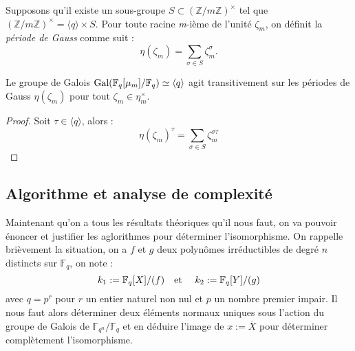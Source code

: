 \documentclass[a4paper]{article} %
\numberwithin{section}{part}
\numberwithin{equation}{section}
\newcommand\nroot[1]{\textit{#1}-ième}
\newcommand\zmodninv[1]{(\mathbb{Z}/#1\mathbb{Z})^{\times}}
\newcommand\GF[1]{\mathbb{F}_{#1}}
\newcommand\etmath{\textup{\quad et \quad}}
\begin{document}
\begin{defn}
Supposons qu'il existe un sous-groupe $S\subset\zmodninv{m}$ tel que
$\zmodninv{m} = \langle{q}\rangle\times S$. Pour toute racine \nroot{m} de
l'unité $\zeta_m$, on définit la \emph{période de Gauss} comme suit :
\begin{equation}
\eta(\zeta_m) = \sum_{\sigma\in S}{\zeta_m^{\sigma}}.
\end{equation}
\end{defn}
\begin{prop}
\label{prop:gaussperconj}
Le groupe de Galois $\textup{Gal}(\GF{q}[\mu_m]/\GF{q})\simeq\langle{q}\rangle$
agit transitivement sur les périodes de Gauss $\eta(\zeta_m)$ pour tout
$\zeta_m\in\eta_m^{\times}$.
\end{prop}
\begin{proof}
Soit $\tau\in\langle{q}\rangle$, alors :
\begin{equation}
\eta(\zeta_m)^{\tau} = \sum_{\sigma\in S}{\zeta_m^{\sigma\tau}}
\end{equation}

\end{proof}
\subsection{Algorithme et analyse de complexité}
\label{sec:algcompcycl}
Maintenant qu'on a tous les résultats théoriques qu'il nous faut, on va pouvoir
énoncer et justifier les aglorithmes pour déterminer l'isomorphisme. 
On rappelle brièvement la situation, on a $f$ et $g$ deux polynômes 
irréductibles de degré $n$ distincts sur $\GF{q}$, on note :
\[k_1 := \GF{q}[X]/(f)\etmath k_2 := \GF{q}[Y]/(g)\]
avec $q = p^r$ pour $r$ un entier naturel non nul et $p$ un nombre premier
impair. Il nous faut alors déterminer deux éléments normaux uniques sous
l'action du groupe de Galois de $\GF{q^n}/\GF{q}$ et en déduire l'image de $x :=
\overline{X}$ pour déterminer complètement l'isomorphisme. 
\end{document}
